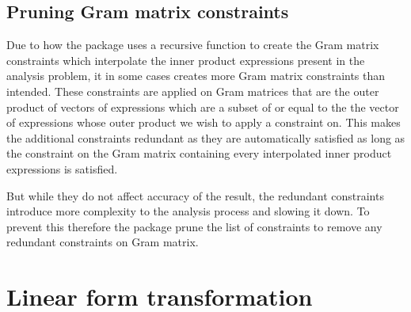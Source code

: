 \subsection*{Pruning Gram matrix constraints}
Due to how the package uses a recursive function to create the Gram matrix constraints which interpolate the inner product expressions present in the analysis problem, it in some cases creates more Gram matrix constraints than intended. These constraints are applied on Gram matrices that are the outer product of vectors of expressions which are a subset of or equal to the the vector of expressions whose outer product we wish to apply a constraint on. This makes the additional constraints redundant as they are automatically satisfied as long as the constraint on the Gram matrix containing every interpolated inner product expressions is satisfied.

But while they do not affect accuracy of the result, the redundant constraints introduce more complexity to the analysis process and slowing it down. To prevent this therefore the package prune the list of constraints to remove any redundant constraints on Gram matrix.

\section{Linear form transformation} \label{sec_linearform}


